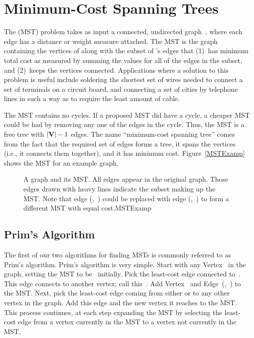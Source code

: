 \section{Minimum-Cost Spanning Trees}
\label{MSTSec}

The   (MST)
problem takes as input a connected, undirected graph~,
where each edge has a distance or weight measure attached.
The MST is the graph containing the vertices of  along with
the subset of 's edges that (1)~has minimum total cost as
measured by summing the values for all of the edges in the subset,
and (2)~keeps the vertices connected.
Applications where a solution to this problem is
useful include soldering the shortest set of wires needed to connect a
set of terminals on a circuit board, and connecting a set of cities by
telephone lines in such a way as to require the least amount of cable.

The MST contains no cycles.
If a proposed MST did have a cycle, a cheaper MST could be
had by removing any one of the edges in the cycle.
Thus, the MST is a free tree with \(|{\textbf{V}}| - 1\)
edges.
The name ``minimum-cost spanning tree'' comes from the fact that the
required set of edges forms a tree, it spans the vertices (i.e., it
connects them together), and it has minimum cost.
Figure~\ref{MSTExamp} shows the MST for an example graph.

\begin{figure}
\vspace{-\bigskipamount}

{A graph and its MST.
All edges appear in the original graph.
Those edges drawn with heavy lines indicate
the subset making up the MST.
Note that edge (,~) could be replaced with edge
(,~) to form a different MST with equal cost.}{MSTExamp}
\bigskip
\end{figure}


\subsection{Prim's Algorithm}
\label{PrimsSec}

The first of our two algorithms for finding MSTs is commonly
referred to as Prim's algorithm.
Prim's algorithm is very simple.
Start with any Vertex~ in the graph, setting the MST
to be~ initially.
Pick the least-cost edge connected to~.
This edge connects  to another vertex; call this~.
Add Vertex~ and Edge~(,~) to the MST.
Next, pick the least-cost edge coming from either  or 
to any other vertex in the graph.
Add this edge and the new vertex it reaches to the MST.
This process continues, at each step expanding the MST by selecting
the least-cost edge from a vertex currently in the MST to a vertex not
currently in the MST. 

